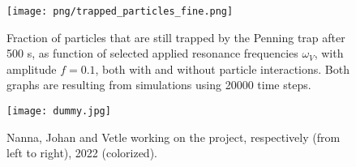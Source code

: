 \begin{figure}
    \texttt{[image: png/trapped\_particles\_fine.png]}
    \caption{Fraction of particles that are still trapped by the Penning trap after 500 \textmu s, as function of selected applied resonance frequencies $\omega_V$, with amplitude $f=0.1$, both with and without particle interactions. Both graphs are resulting from simulations using 20000 time steps.}
    \label{fig:trapped_with}
\end{figure}



\begin{figure}
    \texttt{[image: dummy.jpg]}
    \caption{Nanna, Johan and Vetle working on the project, respectively (from left to right), 2022 (colorized).}
    \label{fig:some_ref} 
\end{figure} 




 





